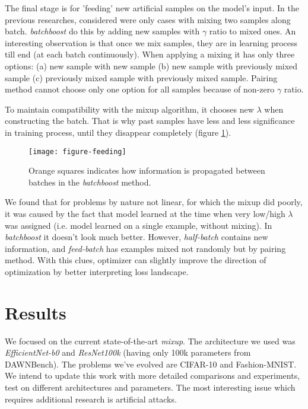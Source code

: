 \documentclass{article}
\begin{document}
The final stage is for 'feeding' new artificial samples on the model's input. In
the previous researches, considered were only cases with mixing two samples along
batch. \emph{batchboost} do this by adding new samples with $\gamma$ ratio to
mixed ones.
An interesting observation is that once we mix samples, they are in learning
process till end (at each batch continuously).
When applying a mixing it has only three options: (a) new sample with new sample
(b) new sample with previously mixed sample (c) previously mixed sample with
previously mixed sample. Pairing method cannot choose only one option for all samples
because of non-zero $\gamma$ ratio.

To maintain compatibility with the mixup
algorithm, it chooses new $\lambda$ when constructing the batch.
That is why past samples have less and less significance in training process,
until they disappear completely (figure \ref{fig:feeding}).

\begin{figure}[H]
  \hspace{0.5cm}
  \texttt{[image: figure-feeding]}
  \caption{Orange squares indicates how information is propagated between
	  batches in the \emph{batchboost} method.}
  \label{fig:feeding}
\end{figure}

We found that for problems by nature not linear, for which the mixup did poorly,
it was caused by the fact that model learned at the time when very low/high
$\lambda$ was assigned (i.e. model learned on a single example, without mixing).
In \emph{batchboost} it doesn't look much better. However, \emph{half-batch}
contains new information, and \emph{feed-batch} has examples mixed not randomly but
by pairing method. With this clues, optimizer can slightly improve the direction of
optimization by better interpreting loss landscape.

\section{Results}
\label{sec:results}

We focused on the current state-of-the-art \emph{mixup}. The architecture we
used was \emph{EfficientNet-b0}\cite{tan2019efficientnet} and
\emph{ResNet100k}\cite{DBLP:journals/corr/HeZRS15} (having only 100k
parameters from DAWNBench\cite{coleman2017dawnbench}). The problems we've evolved are CIFAR-10 and
Fashion-MNIST.
We intend to update this work with more detailed comparisons and experiments,
test on different architectures and parameters. The most interesting
issue which requires additional research is artificial attacks.
\end{document}
